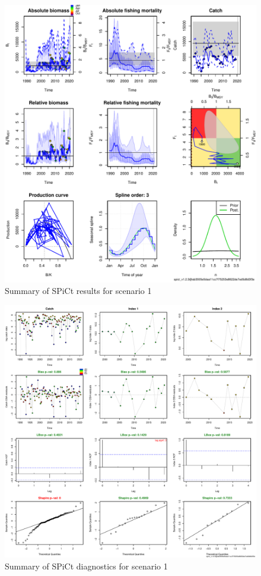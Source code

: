 \documentclass[review]{elsarticle}
\begin{document}
\begin{figure}[h!]
 \centering
 \includegraphics[]{./scenario1out.pdf}
 \caption{Summary of SPiCt results for scenario 1}
 \label{scenario1out}
\end{figure}

\begin{figure}[h!]
 \centering
 \includegraphics[]{./scenario1diag.pdf}
 \caption{Summary of SPiCt diagnostics for scenario 1}
 \label{diag1}
\end{figure}
\end{document}
